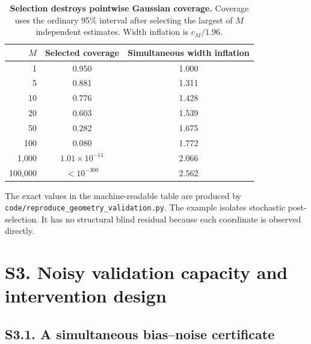 \begin{table}[h]
\centering
\caption{\textbf{Selection destroys pointwise Gaussian coverage.} Coverage uses the ordinary 95\% interval after selecting the largest of $M$ independent estimates. Width inflation is $c_M/1.96$.}
\label{si:tab:gaussian}
\begin{tabular}{rcc}
\toprule
$M$ & Selected coverage & Simultaneous width inflation \\
\midrule
1 & 0.950 & 1.000 \\
5 & 0.881 & 1.311 \\
10 & 0.776 & 1.428 \\
20 & 0.603 & 1.539 \\
50 & 0.282 & 1.675 \\
100 & 0.080 & 1.772 \\
1,000 & $1.01\times10^{-11}$ & 2.066 \\
100,000 & $<10^{-300}$ & 2.562 \\
\bottomrule
\end{tabular}
\end{table}

The exact values in the machine-readable table are produced by \texttt{code/reproduce\_geometry\_validation.py}. The example isolates stochastic post-selection. It has no structural blind residual because each coordinate is observed directly.

\section*{S3. Noisy validation capacity and intervention design}

\subsection*{S3.1. A simultaneous bias--noise certificate}

